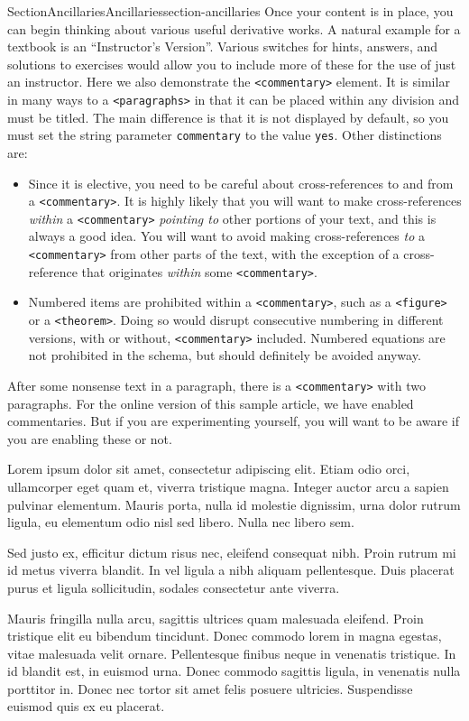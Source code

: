 \documentclass[twoside,10pt,]{article}
\newcommand{\mono}[1]{\texttt{#1}}
\numberwithin{equation}{section}
\begin{document}
\begin{sectionptx}{Section}{Ancillaries}{}{Ancillaries}{}{}{section-ancillaries}
Once your content is in place, you can begin thinking about various useful derivative works.  A natural example for a textbook is an ``Instructor's Version''.  Various switches for hints, answers, and solutions to exercises would allow you to include more of these for the use of just an instructor.  Here we also demonstrate the \mono{<commentary>} element.  It is similar in many ways to a \mono{<paragraphs>} in that it can be placed within any division and must be titled.  The main difference is that it is not displayed by default, so you must set the string parameter \mono{commentary} to the value \mono{yes}. Other distinctions are:%
\begin{itemize}[label=\textbullet]
\item{}Since it is elective, you need to be careful about cross-references to and from a \mono{<commentary>}.  It is highly likely that you will want to make cross-references \emph{within} a \mono{<commentary>} \emph{pointing to} other portions of your text, and this is always a good idea.  You will want to avoid making cross-references \emph{to} a \mono{<commentary>} from other parts of the text, with the exception of a cross-reference that originates \emph{within} some \mono{<commentary>}.%
\item{}Numbered items are prohibited within a \mono{<commentary>}, such as a \mono{<figure>} or a \mono{<theorem>}.  Doing so would disrupt consecutive numbering in different versions, with or without, \mono{<commentary>} included.  Numbered equations are not prohibited in the schema, but should definitely be avoided anyway.%
\end{itemize}
%
\par
After some nonsense text in a paragraph, there is a \mono{<commentary>} with two paragraphs.  For the online version of this sample article, we have enabled commentaries.  But if you are experimenting yourself, you will want to be aware if you are enabling these or not.%
\par
Lorem ipsum dolor sit amet, consectetur adipiscing elit. Etiam odio orci, ullamcorper eget quam et, viverra tristique magna. Integer auctor arcu a sapien pulvinar elementum. Mauris porta, nulla id molestie dignissim, urna dolor rutrum ligula, eu elementum odio nisl sed libero. Nulla nec libero sem.%
\par
Sed justo ex, efficitur dictum risus nec, eleifend consequat nibh. Proin rutrum mi id metus viverra blandit. In vel ligula a nibh aliquam pellentesque. Duis placerat purus et ligula sollicitudin, sodales consectetur ante viverra.%
\par
Mauris fringilla nulla arcu, sagittis ultrices quam malesuada eleifend. Proin tristique elit eu bibendum tincidunt. Donec commodo lorem in magna egestas, vitae malesuada velit ornare. Pellentesque finibus neque in venenatis tristique. In id blandit est, in euismod urna. Donec commodo sagittis ligula, in venenatis nulla porttitor in. Donec nec tortor sit amet felis posuere ultricies. Suspendisse euismod quis ex eu placerat.%
\end{sectionptx}
\end{document}
